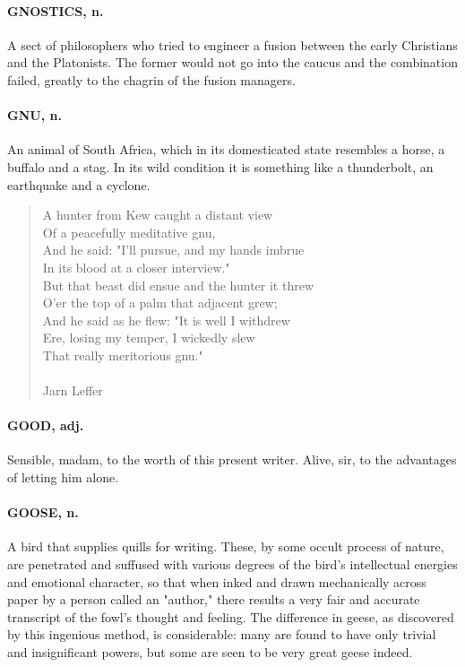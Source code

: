 \documentclass[11pt]{article}
\begin{document}
\paragraph{GNOSTICS, n.}  A sect of philosophers who tried to engineer a fusion
between the early Christians and the Platonists.  The former would not
go into the caucus and the combination failed, greatly to the chagrin
of the fusion managers.

\paragraph{GNU, n.}  An animal of South Africa, which in its domesticated state
resembles a horse, a buffalo and a stag.  In its wild condition it is
something like a thunderbolt, an earthquake and a cyclone.

\begin{quote}   A hunter from Kew caught a distant view \\
      Of a peacefully meditative gnu, \\
  And he said:  "I'll pursue, and my hands imbrue \\
      In its blood at a closer interview." \\
  But that beast did ensue and the hunter it threw \\
      O'er the top of a palm that adjacent grew; \\
  And he said as he flew:  "It is well I withdrew \\
      Ere, losing my temper, I wickedly slew \\
      That really meritorious gnu." \\
 \\
Jarn Leffer \end{quote}


\paragraph{GOOD, adj.}  Sensible, madam, to the worth of this present writer.
Alive, sir, to the advantages of letting him alone.

\paragraph{GOOSE, n.}  A bird that supplies quills for writing.  These, by some
occult process of nature, are penetrated and suffused with various
degrees of the bird's intellectual energies and emotional character,
so that when inked and drawn mechanically across paper by a person
called an "author," there results a very fair and accurate transcript
of the fowl's thought and feeling.  The difference in geese, as
discovered by this ingenious method, is considerable:  many are found
to have only trivial and insignificant powers, but some are seen to be
very great geese indeed.
\end{document}
